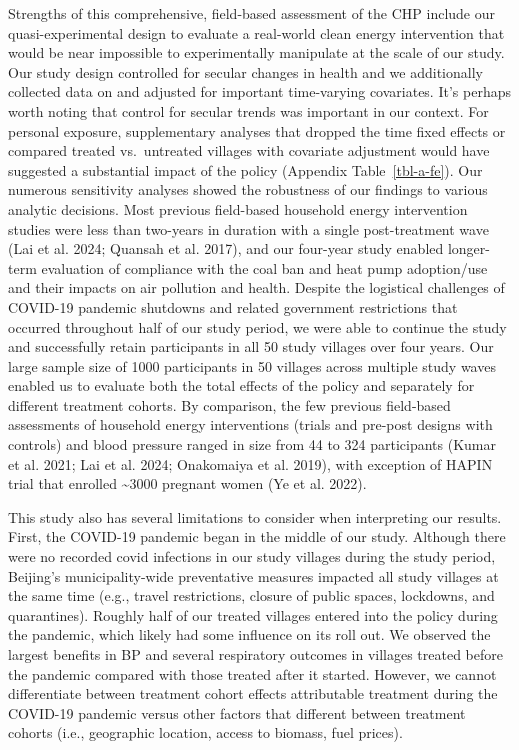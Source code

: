 \documentclass[
  letterpaper,
  DIV=11,
  numbers=noendperiod]{scrartcl}
\begin{document}
Strengths of this comprehensive, field-based assessment of the CHP
include our quasi-experimental design to evaluate a real-world clean
energy intervention that would be near impossible to experimentally
manipulate at the scale of our study. Our study design controlled for
secular changes in health and we additionally collected data on and
adjusted for important time-varying covariates. It's perhaps worth
noting that control for secular trends was important in our context. For
personal exposure, supplementary analyses that dropped the time fixed
effects or compared treated vs.~untreated villages with covariate
adjustment would have suggested a substantial impact of the policy
(Appendix Table~\ref{tbl-a-fe}). Our numerous sensitivity analyses
showed the robustness of our findings to various analytic decisions.
Most previous field-based household energy intervention studies were
less than two-years in duration with a single post-treatment wave (Lai
et al. 2024; Quansah et al. 2017), and our four-year study enabled
longer-term evaluation of compliance with the coal ban and heat pump
adoption/use and their impacts on air pollution and health. Despite the
logistical challenges of COVID-19 pandemic shutdowns and related
government restrictions that occurred throughout half of our study
period, we were able to continue the study and successfully retain
participants in all 50 study villages over four years. Our large sample
size of 1000 participants in 50 villages across multiple study waves
enabled us to evaluate both the total effects of the policy and
separately for different treatment cohorts. By comparison, the few
previous field-based assessments of household energy interventions
(trials and pre-post designs with controls) and blood pressure ranged in
size from 44 to 324 participants (Kumar et al. 2021; Lai et al. 2024;
Onakomaiya et al. 2019), with exception of HAPIN trial that enrolled
\textasciitilde3000 pregnant women (Ye et al. 2022).

This study also has several limitations to consider when interpreting
our results. First, the COVID-19 pandemic began in the middle of our
study. Although  there were no recorded covid infections
in our study villages during the study period, Beijing's
municipality-wide preventative measures impacted all study villages at
the same time (e.g., travel restrictions, closure of public spaces,
lockdowns, and quarantines). Roughly half of our treated villages
entered into the policy during the pandemic, which likely had some
influence on its roll out. We observed the largest benefits in BP and
several respiratory outcomes in villages treated before the pandemic
compared with those treated after it started. However, we cannot
differentiate between treatment cohort effects attributable treatment
during the COVID-19 pandemic versus other factors that different between
treatment cohorts (i.e., geographic location, access to biomass, fuel
prices).
\end{document}
